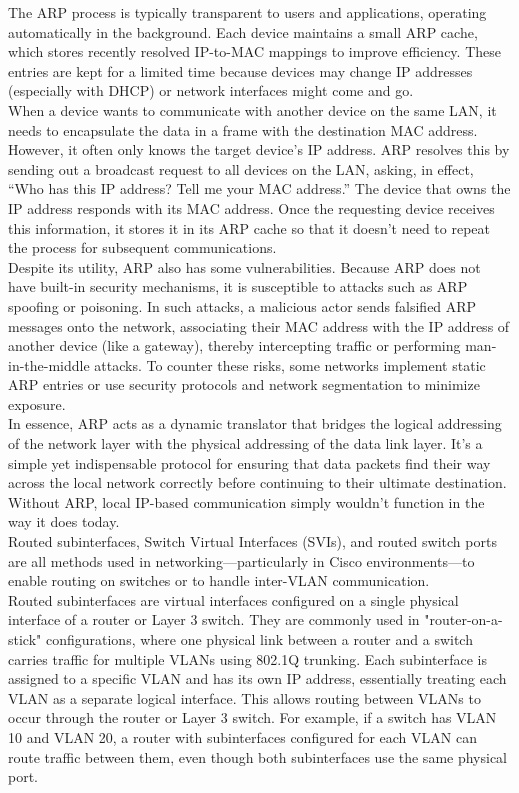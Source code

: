 \documentclass[parindent=0pt]{article}
\begin{document}
The ARP process is typically transparent to users and applications, operating automatically in the background. Each device maintains a small ARP cache, which stores recently resolved IP-to-MAC mappings to improve efficiency. These entries are kept for a limited time because devices may change IP addresses (especially with DHCP) or network interfaces might come and go.\\

When a device wants to communicate with another device on the same LAN, it needs to encapsulate the data in a frame with the destination MAC address. However, it often only knows the target device’s IP address. ARP resolves this by sending out a broadcast request to all devices on the LAN, asking, in effect, “Who has this IP address? Tell me your MAC address.” The device that owns the IP address responds with its MAC address. Once the requesting device receives this information, it stores it in its ARP cache so that it doesn't need to repeat the process for subsequent communications.\\

Despite its utility, ARP also has some vulnerabilities. Because ARP does not have built-in security mechanisms, it is susceptible to attacks such as ARP spoofing or poisoning. In such attacks, a malicious actor sends falsified ARP messages onto the network, associating their MAC address with the IP address of another device (like a gateway), thereby intercepting traffic or performing man-in-the-middle attacks. To counter these risks, some networks implement static ARP entries or use security protocols and network segmentation to minimize exposure.\\

In essence, ARP acts as a dynamic translator that bridges the logical addressing of the network layer with the physical addressing of the data link layer. It's a simple yet indispensable protocol for ensuring that data packets find their way across the local network correctly before continuing to their ultimate destination. Without ARP, local IP-based communication simply wouldn't function in the way it does today.\\

Routed subinterfaces, Switch Virtual Interfaces (SVIs), and routed switch ports are all methods used in networking—particularly in Cisco environments—to enable routing on switches or to handle inter-VLAN communication.\\

Routed subinterfaces are virtual interfaces configured on a single physical interface of a router or Layer 3 switch. They are commonly used in "router-on-a-stick" configurations, where one physical link between a router and a switch carries traffic for multiple VLANs using 802.1Q trunking. Each subinterface is assigned to a specific VLAN and has its own IP address, essentially treating each VLAN as a separate logical interface. This allows routing between VLANs to occur through the router or Layer 3 switch. For example, if a switch has VLAN 10 and VLAN 20, a router with subinterfaces configured for each VLAN can route traffic between them, even though both subinterfaces use the same physical port.\\
\end{document}
